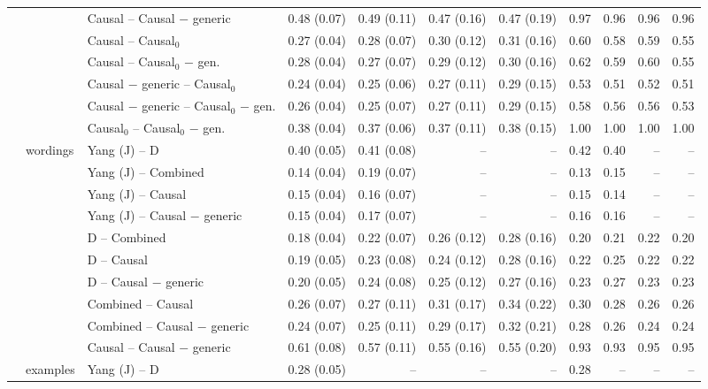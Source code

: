 \begin{tabular}{@{}lllrrrrrrrr@{}}
 &  & Causal -- Causal $-$ generic & 0.48 (0.07) & 0.49 (0.11) & 0.47 (0.16) & 0.47 (0.19) & 0.97 & 0.96 & 0.96 & 0.96 \\
 &  & Causal -- Causal$_0$ & 0.27 (0.04) & 0.28 (0.07) & 0.30 (0.12) & 0.31 (0.16) & 0.60 & 0.58 & 0.59 & 0.55 \\
 &  & Causal -- Causal$_0$ $-$ gen. & 0.28 (0.04) & 0.27 (0.07) & 0.29 (0.12) & 0.30 (0.16) & 0.62 & 0.59 & 0.60 & 0.55 \\
 &  & Causal $-$ generic -- Causal$_0$ & 0.24 (0.04) & 0.25 (0.06) & 0.27 (0.11) & 0.29 (0.15) & 0.53 & 0.51 & 0.52 & 0.51 \\
 &  & Causal $-$ generic -- Causal$_0$ $-$ gen. & 0.26 (0.04) & 0.25 (0.07) & 0.27 (0.11) & 0.29 (0.15) & 0.58 & 0.56 & 0.56 & 0.53 \\
 &  & Causal$_0$ -- Causal$_0$ $-$ gen. & 0.38 (0.04) & 0.37 (0.06) & 0.37 (0.11) & 0.38 (0.15) & 1.00 & 1.00 & 1.00 & 1.00 \\
\addlinespace
 & wordings & Yang (J) -- D & 0.40 (0.05) & 0.41 (0.08) & -- & -- & 0.42 & 0.40 & -- & -- \\
 &  & Yang (J) -- Combined & 0.14 (0.04) & 0.19 (0.07) & -- & -- & 0.13 & 0.15 & -- & -- \\
 &  & Yang (J) -- Causal & 0.15 (0.04) & 0.16 (0.07) & -- & -- & 0.15 & 0.14 & -- & -- \\
 &  & Yang (J) -- Causal $-$ generic & 0.15 (0.04) & 0.17 (0.07) & -- & -- & 0.16 & 0.16 & -- & -- \\
 &  & D -- Combined & 0.18 (0.04) & 0.22 (0.07) & 0.26 (0.12) & 0.28 (0.16) & 0.20 & 0.21 & 0.22 & 0.20 \\
 &  & D -- Causal & 0.19 (0.05) & 0.23 (0.08) & 0.24 (0.12) & 0.28 (0.16) & 0.22 & 0.25 & 0.22 & 0.22 \\
 &  & D -- Causal $-$ generic & 0.20 (0.05) & 0.24 (0.08) & 0.25 (0.12) & 0.27 (0.16) & 0.23 & 0.27 & 0.23 & 0.23 \\
 &  & Combined -- Causal & 0.26 (0.07) & 0.27 (0.11) & 0.31 (0.17) & 0.34 (0.22) & 0.30 & 0.28 & 0.26 & 0.26 \\
 &  & Combined -- Causal $-$ generic & 0.24 (0.07) & 0.25 (0.11) & 0.29 (0.17) & 0.32 (0.21) & 0.28 & 0.26 & 0.24 & 0.24 \\
 &  & Causal -- Causal $-$ generic & 0.61 (0.08) & 0.57 (0.11) & 0.55 (0.16) & 0.55 (0.20) & 0.93 & 0.93 & 0.95 & 0.95 \\
\addlinespace
 & examples & Yang (J) -- D & 0.28 (0.05) & -- & -- & -- & 0.28 & -- & -- & -- \\

\end{tabular}
